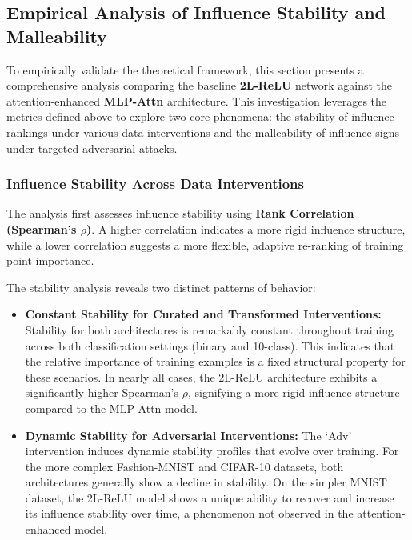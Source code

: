 \documentclass{article}
\theoremstyle{plain}
\theoremstyle{definition}
\theoremstyle{remark}
\begin{document}
\subsection{Empirical Analysis of Influence Stability and Malleability}

To empirically validate the theoretical framework, this section presents a comprehensive analysis comparing the baseline \textbf{2L-ReLU} network against the attention-enhanced \textbf{MLP-Attn} architecture. This investigation leverages the metrics defined above to explore two core phenomena: the stability of influence rankings under various data interventions and the malleability of influence signs under targeted adversarial attacks.

\subsubsection{Influence Stability Across Data Interventions}

The analysis first assesses influence stability using \textbf{Rank Correlation (Spearman's $\rho$)}. A higher correlation indicates a more rigid influence structure, while a lower correlation suggests a more flexible, adaptive re-ranking of training point importance.

The stability analysis reveals two distinct patterns of behavior:
\begin{itemize}
    \item \textbf{Constant Stability for Curated and Transformed Interventions:} Stability for both architectures is remarkably constant throughout training across both classification settings (binary and 10-class). This indicates that the relative importance of training examples is a fixed structural property for these scenarios. In nearly all cases, the 2L-ReLU architecture exhibits a significantly higher Spearman's $\rho$, signifying a more rigid influence structure compared to the MLP-Attn model.

    \item \textbf{Dynamic Stability for Adversarial Interventions:} The `Adv' intervention induces dynamic stability profiles that evolve over training. For the more complex Fashion-MNIST and CIFAR-10 datasets, both architectures generally show a decline in stability. On the simpler MNIST dataset, the 2L-ReLU model shows a unique ability to recover and increase its influence stability over time, a phenomenon not observed in the attention-enhanced model.
\end{itemize}
\end{document}
